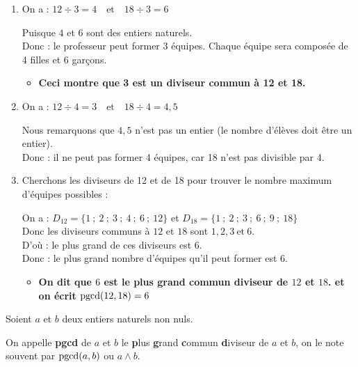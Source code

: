 \documentclass[10pt, a4paper]{article}
\begin{document}
\begin{Solution}[ACTIVITÉ][5]
\begin{enumerate}[leftmargin=*,itemsep=0.5pt]
    \item On a : \quad    $12 \div 3 = 4   \quad \text{et}  \quad 18 \div 3 = 6$

    Puisque $4$ et $6$ sont des entiers naturels. \\
    Donc : le professeur peut former 3 équipes. Chaque équipe sera composée de 4 filles et 6 garçons.

    \begin{itemize}[label=$\blacktriangleright$, leftmargin=*, nosep]
    \item \textbf{Ceci montre que 3 est un \textcolor{PrimaryColor}{diviseur commun} à 12 et 18.}
    \end{itemize}

    \item On a : \quad $12 \div 4 = 3   \quad \text{et}  \quad     18 \div 4 = 4,5$

    Nous remarquons que $4,5$ n'est pas un entier (le nombre d'élèves doit être un entier). \\
    Donc : \quad il ne peut pas former 4 équipes, car 18 n'est pas divisible par 4.

    \item Cherchons les diviseurs de 12 et de 18 pour trouver le nombre maximum d'équipes possibles :

    On a : $D_{12} = \big\{1~;~2~;~3~;~4~;~6~;~12\big\}$ \quad et \quad
    $D_{18} = \big\{1~;~2~;~3~;~6~;~9~;~18\big\}$ \\
    Donc les diviseurs communs à $12$ et $18$ sont $1, 2, 3 ~\text{et}~6$. \\
    D'où : le plus grand de ces diviseurs est $6$. \\
    Donc : le plus grand nombre d'équipes qu'il peut former est $6$.

    \begin{itemize}[label=$\blacktriangleright$, leftmargin=*, nosep]
    \item \textbf{On dit que $6$ est le \textcolor{PrimaryColor}{plus grand commun diviseur}  de $12$ et $18$. et on écrit $\operatorname{pgcd}(12, 18) = 6$}
    \end{itemize}

\end{enumerate}
\end{Solution}

\begin{Definition}[]
Soient $a$ et $b$ deux entiers naturels non nuls.

On appelle \textbf{pgcd} de $a$ et $b$ le \textbf{p}lus \textbf{g}rand \textbf{c}ommun \textbf{d}iviseur  de $a$ et $b$, on le note souvent par
$\operatorname{pgcd}(a, b)$ ou $a \wedge b$.
\end{Definition}
\end{document}
